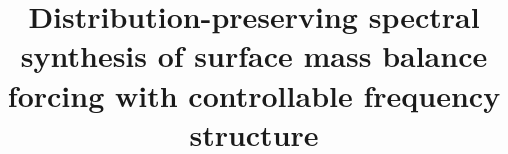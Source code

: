 %

\title{Distribution-preserving spectral synthesis of surface mass balance
forcing with controllable frequency structure}


